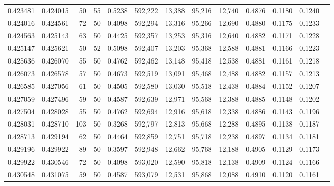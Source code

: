 \begin{tabular}{rrrrrrrrrrrrr}
0.423481 & 0.424015 &    50 &  55 &                                     0.5238 & 592,222 &  13,388 &  95,216 &  12,740 & 0.4876 & 0.1180 & 0.1240 \\
0.424016 & 0.424561 &    72 &  50 &                                     0.4098 & 592,294 &  13,316 &  95,266 &  12,690 & 0.4880 & 0.1175 & 0.1233 \\
0.424563 & 0.425143 &    63 &  50 &                                     0.4425 & 592,357 &  13,253 &  95,316 &  12,640 & 0.4882 & 0.1171 & 0.1228 \\
0.425147 & 0.425621 &    50 &  52 &                                     0.5098 & 592,407 &  13,203 &  95,368 &  12,588 & 0.4881 & 0.1166 & 0.1223 \\
0.425636 & 0.426070 &    55 &  50 &                                     0.4762 & 592,462 &  13,148 &  95,418 &  12,538 & 0.4881 & 0.1161 & 0.1218 \\
0.426073 & 0.426578 &    57 &  50 &                                     0.4673 & 592,519 &  13,091 &  95,468 &  12,488 & 0.4882 & 0.1157 & 0.1213 \\
0.426585 & 0.427056 &    61 &  50 &                                     0.4505 & 592,580 &  13,030 &  95,518 &  12,438 & 0.4884 & 0.1152 & 0.1207 \\
0.427059 & 0.427496 &    59 &  50 &                                     0.4587 & 592,639 &  12,971 &  95,568 &  12,388 & 0.4885 & 0.1148 & 0.1202 \\
0.427504 & 0.428028 &    55 &  50 &                                     0.4762 & 592,694 &  12,916 &  95,618 &  12,338 & 0.4886 & 0.1143 & 0.1196 \\
0.428031 & 0.428710 &   103 &  50 &                                     0.3268 & 592,797 &  12,813 &  95,668 &  12,288 & 0.4895 & 0.1138 & 0.1187 \\
0.428713 & 0.429194 &    62 &  50 &                                     0.4464 & 592,859 &  12,751 &  95,718 &  12,238 & 0.4897 & 0.1134 & 0.1181 \\
0.429196 & 0.429922 &    89 &  50 &                                     0.3597 & 592,948 &  12,662 &  95,768 &  12,188 & 0.4905 & 0.1129 & 0.1173 \\
0.429922 & 0.430546 &    72 &  50 &                                     0.4098 & 593,020 &  12,590 &  95,818 &  12,138 & 0.4909 & 0.1124 & 0.1166 \\
0.430548 & 0.431075 &    59 &  50 &                                     0.4587 & 593,079 &  12,531 &  95,868 &  12,088 & 0.4910 & 0.1120 & 0.1161 \\

\end{tabular}
